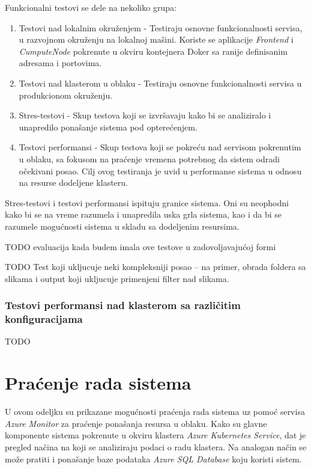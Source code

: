 \documentclass[12pt,oneside]{memoir}
\begin{document}
Funkcionalni testovi se dele na nekoliko grupa:
\begin{enumerate}
\item Testovi nad lokalnim okruženjem - Testiraju osnovne funkcionalnosti servisa, u razvojnom okruženju na lokalnoj mašini. Koriste se aplikacije \emph{Frontend} i \emph{CumputeNode} pokrenute u okviru kontejnera Doker sa ranije definisanim adresama i portovima.
\item Testovi nad klasterom u oblaku - Testiraju osnovne funkcionalnosti servisa u produkcionom okruženju.
\item Stres-testovi - Skup testova koji se izvršavaju kako bi se analiziralo i unapredilo ponašanje sistema pod opterećenjem. 
\item Testovi performansi - Skup testova koji se pokreću nad servisom pokrenutim u oblaku, sa fokusom na praćenje vremena potrebnog da sistem odradi očekivani posao. Cilj ovog testiranja je uvid u performanse sistema u odnosu na resurse dodeljene klasteru.
\end{enumerate}

Stres-testovi i testovi performansi ispituju granice sistema. Oni su neophodni kako bi se na vreme razumela i unapredila uska grla sistema, kao i da bi se razumele mogućnosti sistema u skladu sa dodeljenim resursima.

TODO evaluacija kada budem imala ove testove u zadovoljavajućoj formi

TODO Test koji ukljucuje neki kompleksniji posao
-- na primer, obrada foldera sa slikama i output koji ukljucuje primenjeni filter nad slikama.

\subsubsection{Testovi performansi nad klasterom sa različitim konfiguracijama}
TODO


\section{Praćenje rada sistema}
\label{chp:pracenjemetrika}

U ovom odeljku su prikazane mogućnosti praćenja rada sistema uz pomoć servisa \emph{Azure Monitor} za praćenje ponašanja resursa u oblaku. Kako su glavne komponente sistema pokrenute u okviru klastera \emph{Azure Kubernetes Service}, dat je pregled načina na koji se analiziraju podaci o radu klastera. Na analogan način se može pratiti i ponašanje baze podataka \emph{Azure SQL Database} koju koristi sistem.
\end{document}
